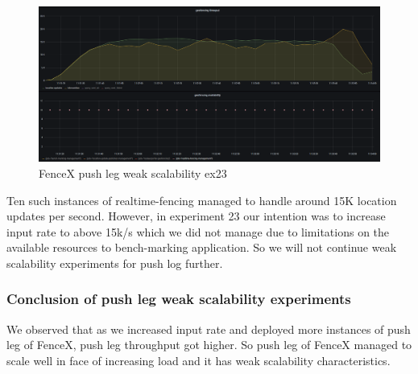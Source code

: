 \documentclass[a4]{report}
\begin{document}
    \begin{figure}
        \caption{FenceX push leg weak scalability ex23}
        \label{fig:ex23}
        \includegraphics[scale=0.5]{images/evaluation/ex23-benchmarking-ongoing-2per2sec.png}
    \end{figure}

    \clearpage

    Ten such instances of realtime-fencing managed to handle around 15K location updates per second.
    However, in experiment 23 our intention was to increase input rate to above 15k/s which we did not manage due to
    limitations on the available resources to bench-marking application.
    So we will not continue weak scalability experiments for push log further.

    \subsubsection{Conclusion of push leg weak scalability experiments}
    We observed that as we increased input rate and deployed more instances of push leg of FenceX, push leg
    throughput got higher.
    So push leg of FenceX managed to scale well in face of increasing load and it has weak scalability characteristics.
\end{document}
